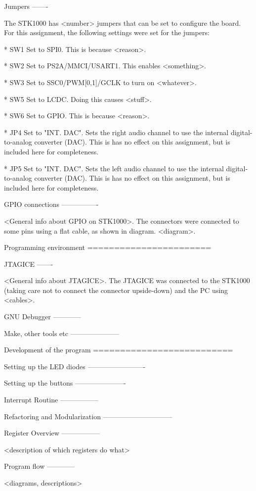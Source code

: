 \documentclass{article}
\begin{document}
Jumpers
------- 

The STK1000 has <number> jumpers that can be set to configure the board.
For this assignment, the following settings were set for the jumpers:

* SW1
Set to SPI0.
This is because <reason>.


* SW2
Set to PS2A/MMCI/USART1. 
This enables <something>.

* SW3
Set to SSC0/PWM[0,1]/GCLK to turn on <whatever>.

* SW5
Set to LCDC.
Doing this causes <stuff>.

* SW6
Set to GPIO.
This is because <reason>.

* JP4
Set to "INT. DAC".
Sets the right audio channel to use the internal digital-to-analog converter (DAC).
This is has no effect on this assignment, but is included here for completeness.

* JP5
Set to "INT. DAC".
Sets the left audio channel to use the internal digital-to-analog converter (DAC).
This is has no effect on this assignment, but is included here for completeness.

GPIO connections
----------------

<General info about GPIO on STK1000>.
The connectors were connected to some pins using a flat cable, as shown in diagram.
<diagram>.


Programming environment
=======================

JTAGICE
-------

<General info about JTAGICE>. The JTAGICE was connected to the STK1000 (taking care not to connect the connector upside-down) and the PC using <cables>.

GNU Debugger
------------

Make, other tools etc
---------------------

Development of the program
==========================

Setting up the LED diodes
-------------------------

Setting up the buttons
----------------------

Interrupt Routine
-----------------

Refactoring and Modularization
------------------------------

Register Overview
-----------------

<description of which registers do what>

Program flow
------------

<diagrams, descriptions>
\end{document}
